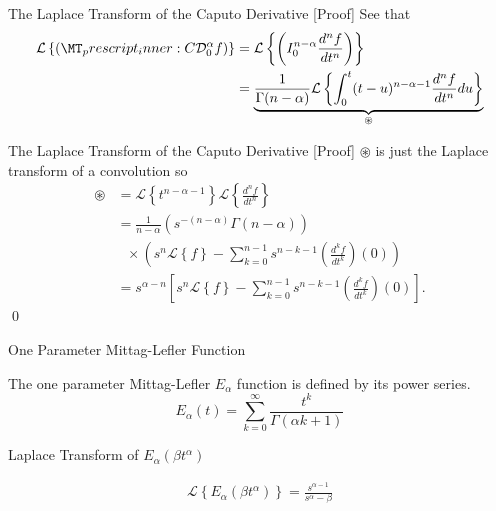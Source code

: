 \documentclass[pdf]{beamer}
\newcommand{\laplace}[1]{ \mathcal{L} \left\{ #1 \right\} }
\newcommand{\rli}[3]{ \left( I_{#1}^{#2} #3 \right) }
\newcommand{\der}[3]{ \frac{d^{#3}#1}{d#2^{#3}} }
\newcommand{\capder}[3]{ \left( \prescript{C}{}{\mathcal{D}_{#1}^{#2}} #3 \right) }
\begin{document}
\begin{frame}{The Laplace Transform of the Caputo Derivative [Proof]}
	See that
	\begin{align*}
		\laplace{\capder{0}{\alpha}{f}} &= \laplace{  \rli{0}{n-\alpha}{\der{f}{t}{n}}} \\
			&= \underbrace{\frac{1}{\Gamma(n-\alpha)}\laplace{ \int_0^t (t-u)^{n-\alpha-1} \der{f}{t}{n} du}}_{\circledast} \\ 
	\end{align*}
\end{frame}

\begin{frame}{The Laplace Transform of the Caputo Derivative [Proof]}
	$ \circledast $ is just the Laplace transform of a convolution so 
	\begin{align*}
		\circledast &= \laplace{t^{n-\alpha-1}} \laplace{\der{f}{t}{n}} \\
		&= \frac{1}{n-\alpha} \left( s^{-(n-\alpha)} \Gamma(n-\alpha) \right) \\
		& \ \ \ \times \left( s^n \laplace{f} - \sum_{k=0}^{n-1} s^{n-k-1} \left( \der{f}{t}{k} \right)(0) \right) \\
		&= s^{\alpha - n} \left[ s^n \laplace{f} - \sum_{k=0}^{n-1} s^{n-k-1} \left( \der{f}{t}{k} \right)(0) \right].
	\end{align*}
	\qed
\end{frame}

\begin{frame}{One Parameter Mittag-Lefler Function}
	\begin{definition}
		The one parameter Mittag-Lefler $ E_\alpha $ function is defined by its power series.
		$$
			E_\alpha(t) = \sum_{k=0}^{\infty} \frac{t^k}{\Gamma(\alpha k + 1)}
		$$
	\end{definition}
\end{frame}

\begin{frame}{Laplace Transform of $E_\alpha(\beta t^\alpha)$}
	\begin{lemma}
		\begin{align*}	
			\laplace{ E_\alpha (\beta t^\alpha)} = \frac{s^{\alpha - 1}}{s^\alpha - \beta}
		\end{align*}
	\end{lemma}
\end{frame}
\end{document}
